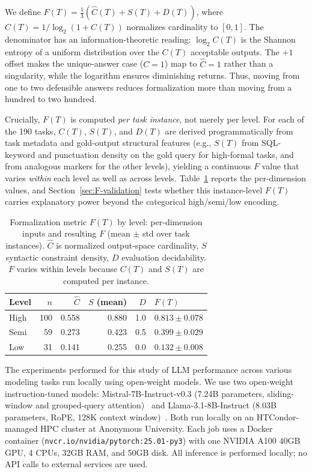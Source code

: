 \documentclass[runningheads]{llncs}
\begin{document}
We define $F(T) = \tfrac{1}{3}(\hat{C}(T) + S(T) + D(T))$, where $\hat{C}(T) = 1 / \log_2(1 + C(T))$ normalizes cardinality to $[0,1]$. The denominator has an information-theoretic reading: $\log_2 C(T)$ is the Shannon entropy of a uniform distribution over the $C(T)$ acceptable outputs. The $+1$ offset makes the unique-answer case ($C{=}1$) map to $\hat{C}{=}1$ rather than a singularity, while the logarithm ensures diminishing returns. Thus, moving from one to two defensible answers reduces formalization more than moving from a hundred to two hundred.

Crucially, $F(T)$ is computed \emph{per task instance}, not merely per level. For each of the 190 tasks, $C(T)$, $S(T)$, and $D(T)$ are derived programmatically from task metadata and gold-output structural features (e.g., $S(T)$ from SQL-keyword and punctuation density on the gold query for high-formal tasks, and from analogous markers for the other levels), yielding a continuous $F$ value that varies \emph{within} each level as well as across levels. Table~\ref{tab:F-dims} reports the per-dimension values, and Section~\ref{sec:F-validation} tests whether this instance-level $F(T)$ carries explanatory power beyond the categorical high/semi/low encoding.

\begin{table}[ht]
\centering
\caption{Formalization metric $F(T)$ by level: per-dimension inputs and resulting $F$ (mean $\pm$ std over task instances). $\hat{C}$ is normalized output-space cardinality, $S$ syntactic constraint density, $D$ evaluation decidability. $F$ varies within levels because $C(T)$ and $S(T)$ are computed per instance.}
\label{tab:F-dims}
\setlength{\tabcolsep}{6pt}
\begin{tabular}{lrrrrl}
\toprule
Level & $n$ & $\hat{C}$ & $S$ (mean) & $D$ & $F(T)$ \\
\midrule
High & 100 & 0.558 & 0.880 & 1.0 & $0.813 \pm 0.078$ \\
Semi &  59 & 0.273 & 0.423 & 0.5 & $0.399 \pm 0.029$ \\
Low  &  31 & 0.141 & 0.255 & 0.0 & $0.132 \pm 0.008$ \\
\bottomrule
\end{tabular}
\end{table}

The experiments performed for this study of LLM performance across various modeling tasks run locally using open-weight models.  We use two open-weight instruction-tuned models: Mistral-7B-Instruct-v0.3 (7.24B parameters, sliding-window and grouped-query attention)~\cite{jiang2023mistral} and Llama-3.1-8B-Instruct (8.03B parameters, RoPE, 128K context window)~\cite{grattafiori2024llama3herdmodels}. Both run locally on an HTCondor-managed HPC cluster at Anonymous University. Each job uses a Docker container (\texttt{nvcr.io/nvidia/pytorch:25.01-py3}) with one NVIDIA A100 40GB GPU, 4 CPUs, 32GB RAM, and 50GB disk. All inference is performed locally; no API calls to external services are used.
\end{document}
